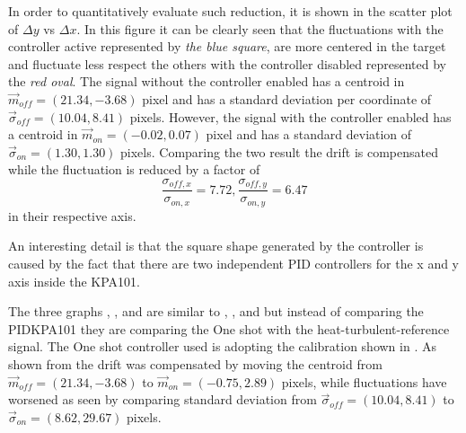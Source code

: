 In order to quantitatively evaluate such reduction, it is shown in  the scatter plot of $\Delta y$ vs $\Delta x$. In this figure it can be clearly seen that the fluctuations with the controller active represented by \textit{the blue square}, are more centered in the target and fluctuate less respect the others with the controller disabled represented by the \textit{red oval}.
The signal without the controller enabled has a centroid in $\vec{m}_{off} = (21.34, -3.68)$ pixel and has a standard deviation per coordinate of $\vec{\sigma}_{off} = (10.04, 8.41)$ pixels. However, the signal with the controller enabled has a centroid in $\vec{m}_{on} = (-0.02,0.07)$ pixel and has a standard deviation of $\vec{\sigma}_{on} = (1.30, 1.30)$ pixels. Comparing the two result the drift is compensated while the fluctuation is reduced by a factor of
\begin{equation}
  \frac{\sigma_{off, x}}{\sigma_{on, x}} = 7.72, \frac{\sigma_{off, y}}{\sigma_{on, y}} = 6.47
\end{equation}
in their respective axis.

An interesting detail is that the square shape generated by the controller is caused by the fact that there are two independent PID controllers for the x and y axis inside the KPA101.


The three graphs , , and  are similar to , , and  but instead of comparing the PIDKPA101 they are comparing the One shot with the heat-turbulent-reference signal. The One shot controller used is adopting the calibration shown in .
As shown from  the drift was compensated by moving the centroid from $\vec{m}_{off} = (21.34, -3.68)$ to $\vec{m}_{on} = (-0.75, 2.89)$ pixels, while fluctuations have worsened as seen by comparing standard deviation from $\vec{\sigma}_{off} = (10.04, 8.41)$ to $\vec{\sigma}_{on} = (8.62, 29.67)$ pixels.

